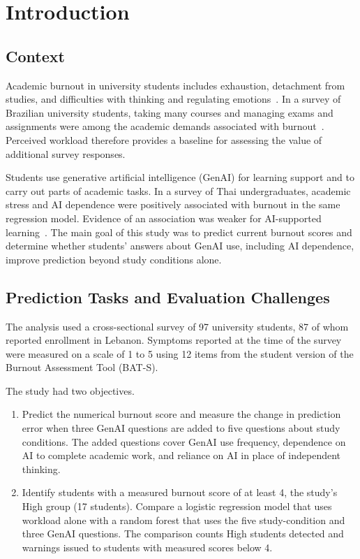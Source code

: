 \section{Introduction}
\label{sec:introduction}

\subsection{Context}

Academic burnout in university students includes exhaustion, detachment from studies, and difficulties with thinking and regulating emotions~\cite{carmonahalty2024bats}. In a survey of Brazilian university students, taking many courses and managing exams and assignments were among the academic demands associated with burnout~\cite{camara2024stressors}. Perceived workload therefore provides a baseline for assessing the value of additional survey responses.

Students use generative artificial intelligence (GenAI) for learning support and to carry out parts of academic tasks. In a survey of Thai undergraduates, academic stress and AI dependence were positively associated with burnout in the same regression model. Evidence of an association was weaker for AI-supported learning~\cite{plensamai2026burnout}. The main goal of this study was to predict current burnout scores and determine whether students' answers about GenAI use, including AI dependence, improve prediction beyond study conditions alone.

\subsection{Prediction Tasks and Evaluation Challenges}

The analysis used a cross-sectional survey of 97 university students, 87 of whom reported enrollment in Lebanon. Symptoms reported at the time of the survey were measured on a scale of 1 to 5 using 12 items from the student version of the Burnout Assessment Tool (BAT-S).

The study had two objectives.

\begin{enumerate}
\item Predict the numerical burnout score and measure the change in prediction error when three GenAI questions are added to five questions about study conditions. The added questions cover GenAI use frequency, dependence on AI to complete academic work, and reliance on AI in place of independent thinking.
\item Identify students with a measured burnout score of at least 4, the study's High group (17 students). Compare a logistic regression model that uses workload alone with a random forest that uses the five study-condition and three GenAI questions. The comparison counts High students detected and warnings issued to students with measured scores below 4.
\end{enumerate}

